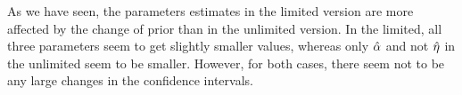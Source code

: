As we have seen, the parameters estimates in the limited version are more affected by the change of prior than in the unlimited version. In the limited, all three parameters seem to get slightly smaller values, whereas only $\hat{\alpha}$ and not $\hat{\eta}$ in the unlimited seem to be smaller. However, for both cases, there seem not to be any large changes in the confidence intervals. 